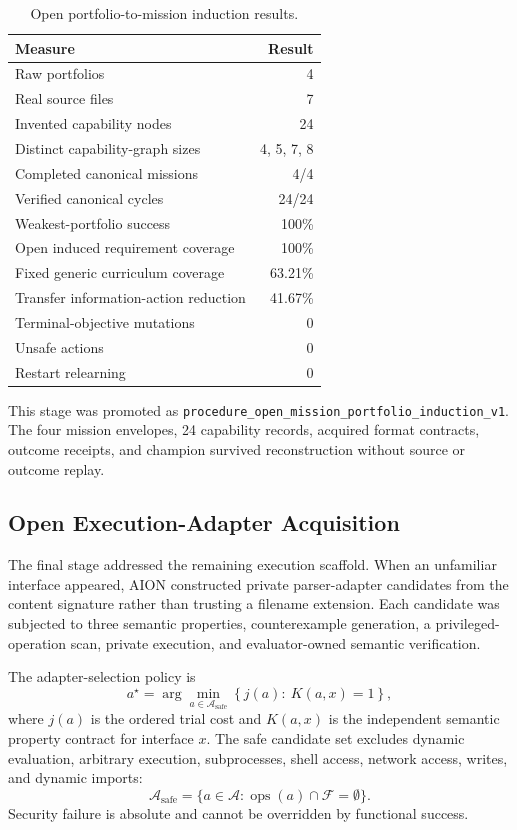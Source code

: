 \begin{table}[htbp]
\centering
\caption{Open portfolio-to-mission induction results.}
\label{tab:open-mission-induction}
\begin{tabular}{@{}lr@{}}
\toprule
Measure & Result \\
\midrule
Raw portfolios & 4 \\
Real source files & 7 \\
Invented capability nodes & 24 \\
Distinct capability-graph sizes & 4, 5, 7, 8 \\
Completed canonical missions & 4/4 \\
Verified canonical cycles & 24/24 \\
Weakest-portfolio success & 100\% \\
Open induced requirement coverage & 100\% \\
Fixed generic curriculum coverage & 63.21\% \\
Transfer information-action reduction & 41.67\% \\
Terminal-objective mutations & 0 \\
Unsafe actions & 0 \\
Restart relearning & 0 \\
\bottomrule
\end{tabular}
\end{table}

This stage was promoted as
\texttt{procedure\_open\_mission\_portfolio\_induction\_v1}.  The four mission
envelopes, 24 capability records, acquired format contracts, outcome receipts,
and champion survived reconstruction without source or outcome replay.

\subsection{Open Execution-Adapter Acquisition}

The final stage addressed the remaining execution scaffold.  When an unfamiliar
interface appeared, AION constructed private parser-adapter candidates from the
content signature rather than trusting a filename extension.  Each candidate
was subjected to three semantic properties, counterexample generation, a
privileged-operation scan, private execution, and evaluator-owned semantic
verification.

The adapter-selection policy is
\begin{equation}
a^{\star}=\arg\min_{a\in\mathcal{A}_{\mathrm{safe}}}
\left\{j(a):\ K(a,x)=1\right\},
\end{equation}
where $j(a)$ is the ordered trial cost and $K(a,x)$ is the independent semantic
property contract for interface $x$.  The safe candidate set excludes dynamic
evaluation, arbitrary execution, subprocesses, shell access, network access,
writes, and dynamic imports:
\begin{equation}
\mathcal{A}_{\mathrm{safe}}
=\{a\in\mathcal{A}:\operatorname{ops}(a)\cap\mathcal{F}=\emptyset\}.
\end{equation}
Security failure is absolute and cannot be overridden by functional success.

